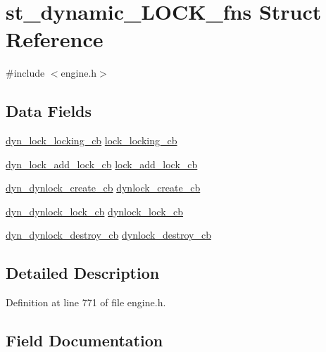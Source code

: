 \hypertarget{structst__dynamic___l_o_c_k__fns}{}\section{st\+\_\+dynamic\+\_\+\+L\+O\+C\+K\+\_\+fns Struct Reference}
\label{structst__dynamic___l_o_c_k__fns}


{\ttfamily \#include $<$engine.\+h$>$}

\subsection*{Data Fields}
\begin{DoxyCompactItemize}
\item 
\hyperlink{include_2openssl_2engine_8h_a13c38e44eaca5d817a3e7cf0ddfafc88}{dyn\+\_\+lock\+\_\+locking\+\_\+cb} \hyperlink{structst__dynamic___l_o_c_k__fns_a5307a5c30b4b665de69d8da151ccff0d}{lock\+\_\+locking\+\_\+cb}
\item 
\hyperlink{include_2openssl_2engine_8h_a61e818120dba69e5c9b701526ab89910}{dyn\+\_\+lock\+\_\+add\+\_\+lock\+\_\+cb} \hyperlink{structst__dynamic___l_o_c_k__fns_afd651a2952b8bce89f71dc969cb9caf4}{lock\+\_\+add\+\_\+lock\+\_\+cb}
\item 
\hyperlink{include_2openssl_2engine_8h_a15257fbbeb396254a896ba607f6d0814}{dyn\+\_\+dynlock\+\_\+create\+\_\+cb} \hyperlink{structst__dynamic___l_o_c_k__fns_a86a3d56dcc4a1071037dbeb866fedd08}{dynlock\+\_\+create\+\_\+cb}
\item 
\hyperlink{include_2openssl_2engine_8h_a4f3cec5ef8f9661671c3ff8c6da63610}{dyn\+\_\+dynlock\+\_\+lock\+\_\+cb} \hyperlink{structst__dynamic___l_o_c_k__fns_a6b4ba5634816ccd96b05fa15af4764df}{dynlock\+\_\+lock\+\_\+cb}
\item 
\hyperlink{include_2openssl_2engine_8h_aca2ea629691acfe8e5d248a1604f65b1}{dyn\+\_\+dynlock\+\_\+destroy\+\_\+cb} \hyperlink{structst__dynamic___l_o_c_k__fns_ad7b64e475c483622cfa140300df33911}{dynlock\+\_\+destroy\+\_\+cb}
\end{DoxyCompactItemize}


\subsection{Detailed Description}


Definition at line 771 of file engine.\+h.



\subsection{Field Documentation}
